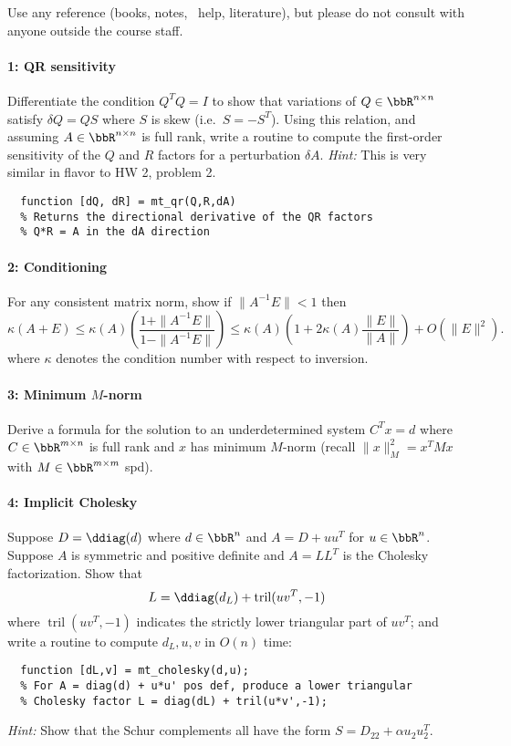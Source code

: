 \documentclass[12pt, leqno]{article} %
\newcommand{\tril}{\operatorname{tril}}
\begin{document}

Use any reference (books, notes, \matlab\ help, literature),
but please do not consult with anyone outside the course staff.

\paragraph*{1: QR sensitivity}
Differentiate the condition $Q^T Q = I$ to show that variations
of $Q \in \bbR^{n \times n}$ satisfy $\delta Q = Q S$ where $S$ is skew (i.e.~$S= -S^T$).
Using this relation, and assuming $A \in \bbR^{n \times n}$ is full rank,
write a routine to compute the first-order
sensitivity of the $Q$ and $R$ factors for a perturbation $\delta A$.
{\em Hint:} This is very similar in flavor to HW 2, problem 2.
\begin{lstlisting}
  function [dQ, dR] = mt_qr(Q,R,dA)
  % Returns the directional derivative of the QR factors
  % Q*R = A in the dA direction
\end{lstlisting}

\paragraph*{2: Conditioning}
For any consistent matrix norm, show if $\|A^{-1} E\| < 1$ then
\[
  \kappa(A+E) \leq
  \kappa(A) \left( \frac{1+\|A^{-1}E\|}{1-\|A^{-1}E\|} \right) \leq
  \kappa(A) \left( 1 + 2 \kappa(A) \frac{\|E\|}{\|A\|} \right) + O(\|E\|^2).
\]
where $\kappa$ denotes the condition number with respect to inversion.

\paragraph*{3: Minimum $M$-norm}
Derive a formula for the solution to an underdetermined system
$C^T x = d$ where $C \in \bbR^{m \times n}$ is full rank and
$x$ has minimum $M$-norm
(recall $\|x\|_M^2 = x^T M x$ with $M \in \bbR^{m \times m}$ spd).

\paragraph*{4: Implicit Cholesky}
Suppose $D = \ddiag(d)$ where $d \in \bbR^n$
and $A = D + uu^T$ for $u \in \bbR^n$.  Suppose $A$ is symmetric
and positive definite and $A = L L^T$ is the Cholesky factorization.
Show that
\[
  L = \ddiag(d_L) + \tril(uv^T,-1)
\]
where $\tril(uv^T,-1)$ indicates the strictly lower triangular
part of $uv^T$; and write a routine to compute $d_L, u, v$ in $O(n)$
time:
\begin{lstlisting}
  function [dL,v] = mt_cholesky(d,u);
  % For A = diag(d) + u*u' pos def, produce a lower triangular
  % Cholesky factor L = diag(dL) + tril(u*v',-1);
\end{lstlisting}
{\em Hint:} Show that the Schur complements all have the form
$S = D_{22} + \alpha u_2 u_2^T$.
\end{document}

